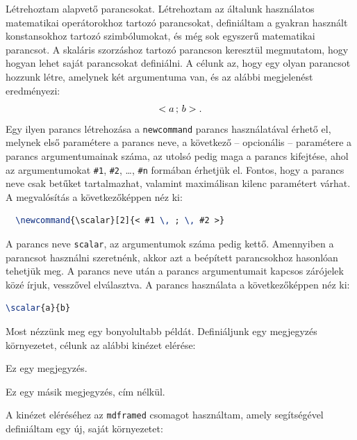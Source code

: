 Létrehoztam alapvető parancsokat. Létrehoztam az általunk használatos
matematikai operátorokhoz tartozó parancsokat, definiáltam a gyakran használt
konstansokhoz tartozó szimbólumokat, és még sok egyszerű matematikai parancsot.
A skaláris szorzáshoz tartozó parancson keresztül megmutatom, hogy hogyan
lehet saját parancsokat definiálni. A célunk az, hogy egy olyan parancsot
hozzunk létre, amelynek két argumentuma van, és az alábbi megjelenést
eredményezi:
\[
	< a \, ; \, b >
	\text.
\]
Egy ilyen parancs létrehozása a \texttt{newcommand} parancs használatával
érhető el, melynek első paramétere a parancs neve, a következő -- opcionális --
paramétere a parancs argumentumainak száma, az utolsó pedig maga a parancs
kifejtése, ahol az argumentumokat \texttt{\#1}, \texttt{\#2}, \ldots,
\texttt{\#n} formában érhetjük el. Fontos, hogy a parancs neve csak betűket
tartalmazhat, valamint maximálisan kilenc paramétert várhat. A megvalósítás
a következőképpen néz ki:

\begin{lstlisting}[language=tex,caption={Skaláris szorzás parancs definíciója]}]
  % \newcommand{<parancs neve>}[<argumentumok száma>]{<parancs definíciója>}
  \newcommand{\scalar}[2]{< #1 \, ; \, #2 >}
\end{lstlisting}

A parancs neve \texttt{scalar}, az argumentumok száma pedig kettő. Amennyiben
a parancsot használni szeretnénk, akkor azt a beépített parancsokhoz hasonlóan
tehetjük meg. A parancs neve után a parancs argumentumait kapcsos zárójelek
közé írjuk, vesszővel elválasztva. A parancs használata a következőképpen
néz ki:

\begin{lstlisting}[language=tex,caption={Skaláris szorzás parancs használata}]
  \scalar{a}{b}
\end{lstlisting}

Most nézzünk meg egy bonyolultabb példát. Definiáljunk egy megjegyzés
környezetet, célunk az alábbi kinézet elérése:

\begin{note}
	\noindent Ez egy megjegyzés.
\end{note}
\begin{note}
	\noindent Ez egy másik megjegyzés, cím nélkül.
\end{note}

A kinézet eléréséhez az \texttt{mdframed} csomagot használtam, amely
segítségével definiáltam egy új, saját környezetet:

